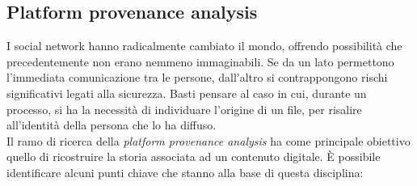 \subsection{Platform provenance analysis}
\label{sub_sec:platform_provenance_analysis}

I social network hanno radicalmente cambiato il mondo, offrendo possibilità che precedentemente non erano nemmeno immaginabili. Se da un lato permettono l'immediata comunicazione tra le persone, dall'altro si contrappongono rischi significativi legati alla sicurezza. Basti pensare al caso in cui, durante un processo, si ha la necessità di individuare l'origine di un file, per risalire all'identità della persona che lo ha diffuso.\\
Il ramo di ricerca della \textit{platform provenance analysis} ha come principale obiettivo quello di ricostruire la storia associata ad un contenuto digitale. È possibile identificare alcuni punti chiave che stanno alla base di questa disciplina:

